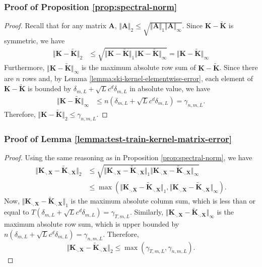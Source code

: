 \subsubsection{Proof of Proposition \ref{prop:spectral-norm}}\label{sec:proof-spectral-norm}

\spectralnorm*
\begin{proof}
    Recall that for any matrix $\textbf{A}$, $\Vert \textbf{A} \Vert_2 \leq \sqrt{\Vert \textbf{A} \Vert_1 \Vert \textbf{A} \Vert_\infty}$. Since $\textbf{K}-\tilde{\textbf{K}}$ is symmetric, we have
    \begin{align*}
        \Vert \textbf{K}-\tilde{\textbf{K}}\Vert_2&\leq \sqrt{\Vert \textbf{K}-\tilde{\textbf{K}}\Vert_1\Vert \textbf{K}-\tilde{\textbf{K}}\Vert_\infty} = \Vert \textbf{K}-\tilde{\textbf{K}}\Vert_\infty
    \end{align*}
    Furthermore, $\Vert \textbf{K}-\tilde{\textbf{K}}\Vert_\infty$ is the maximum absolute row sum of $\textbf{K}-\tilde{\textbf{K}}$. Since there are $n$ rows and, by Lemma \ref{lemma:ski-kernel-elementwise-error}, each element of $\textbf{K} - \tilde{\textbf{K}}$ is bounded by $\delta_{m,L}+\sqrt{L}c^d\delta_{m,L}$ in absolute value, we have
    \begin{align*}
        \Vert \textbf{K}-\tilde{\textbf{K}}\Vert_\infty &\leq n \left(\delta_{m,L}+\sqrt{L} c^d\delta_{m,L}\right) = \gamma_{n,m,L}.
    \end{align*}
    Therefore, $\Vert \textbf{K}-\tilde{\textbf{K}}\Vert_2 \leq \gamma_{n,m,L}$.
\end{proof}

\subsubsection{Proof of Lemma \ref{lemma:test-train-kernel-matrix-error}}\label{sec:proof-test-train-kernel-matrix-error}
\testtrainkernelmatrixerror*
\begin{proof}
    Using the same reasoning as in Proposition \ref{prop:spectral-norm}, we have
    \begin{align*}
        \Vert \textbf{K}_{\cdot,\textbf{X}}-\tilde{\textbf{K}}_{\cdot,\textbf{X}}\Vert_2&\leq \sqrt{\Vert \textbf{K}_{\cdot,\textbf{X}}-\tilde{\textbf{K}}_{\cdot,\textbf{X}}\Vert_1\Vert \textbf{K}_{\cdot,\textbf{X}}-\tilde{\textbf{K}}_{\cdot,\textbf{X}}\Vert_\infty} \\
        &\leq \max \left(\Vert \textbf{K}_{\cdot,\textbf{X}}-\tilde{\textbf{K}}_{\cdot,\textbf{X}}\Vert_1, \Vert \textbf{K}_{\cdot,\textbf{X}}-\tilde{\textbf{K}}_{\cdot,\textbf{X}}\Vert_\infty\right).
    \end{align*}
    Now, $\Vert \textbf{K}_{\cdot,\textbf{X}}-\tilde{\textbf{K}}_{\cdot,\textbf{X}}\Vert_1$ is the maximum absolute column sum, which is less than or equal to $T(\delta_{m,L} + \sqrt{L}c^d\delta_{m,L}) = \gamma_{T,m,L}$. Similarly, $\Vert \textbf{K}_{\cdot,\textbf{X}}-\tilde{\textbf{K}}_{\cdot,\textbf{X}}\Vert_\infty$ is the maximum absolute row sum, which is upper bounded by $n(\delta_{m,L} + \sqrt{L}c^d\delta_{m,L}) = \gamma_{n,m,L}$. Therefore,
    $$
    \Vert \textbf{K}_{\cdot,\textbf{X}}-\tilde{\textbf{K}}_{\cdot,\textbf{X}}\Vert_2 \leq \max(\gamma_{T,m,L},\gamma_{n,m,L}).
    $$
\end{proof}
